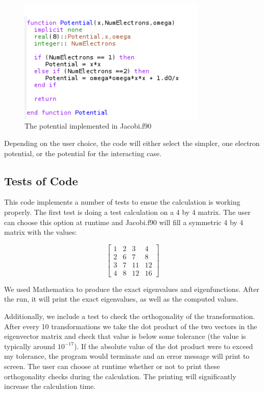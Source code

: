 \documentclass[%
oneside,                 %
final,                   %
10pt]{article}
\begin{document}
\begin{figure}[H]\label{fig:Potential}
  \centering
    \includegraphics[width=0.8\textwidth]{Potential.PNG}
    \caption{The potential implemented in Jacobi.f90}
\end{figure}

Depending on the user choice, the code will either select the simpler, one electron potential, or the potential for the interacting case.

\subsection{Tests of Code}

This code implements a number of tests to ensue the calculation is working properly.  The first test is doing a test calculation on a 4 by 4 matrix.  The user can choose this option at runtime and Jacobi.f90  will fill a symmetric 4 by 4 matrix with the values:

\begin{equation}
 \begin{bmatrix} 1 & 2 & 3 & 4 \\
                           2 & 6 & 7 & 8 \\
		      3 & 7 & 11 & 12 \\
		     4 & 8 & 12 & 16
             \end{bmatrix}  
\end{equation}

We used Mathematica to produce the exact eigenvalues and eigenfunctions.  After the run, it will print the exact eigenvalues, as well as the computed values.

Additionally, we include a test to check the orthogonality of the transformation.  After every 10 transformations we take the dot product of the two vectors in the eigenvector matrix and check that value is below some tolerance (the value is typically around $10^{-17}$).  If the absolute value of the dot product were to exceed my tolerance, the program would terminate and an error message will print to screen.  The user can choose at runtime whether or not to print these orthogonality checks during the calculation.  The printing will significantly increase the calculation time.
\end{document}
